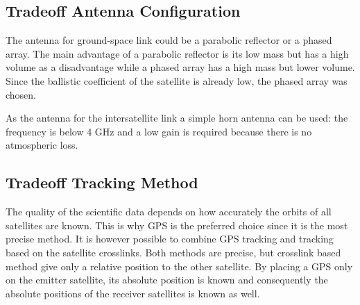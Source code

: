 \subsection{Tradeoff Antenna Configuration}
The antenna for ground-space link could be a parabolic reflector or a phased array. The main advantage of a parabolic reflector is its low mass but has a high volume as a disadvantage while a phased array has a high mass but lower volume. Since the ballistic coefficient of the satellite is already low, the phased array was chosen.

As the antenna for the intersatellite link a simple horn antenna can be used: the frequency is below 4 GHz and a low gain is required because there is no atmospheric loss.

\subsection{Tradeoff Tracking Method}
\label{TOcommTA}
The quality of the scientific data depends on how accurately the orbits of all satellites are known. This is why GPS is the preferred choice since it is the most precise method. It is however possible to combine GPS tracking and tracking based on the satellite crosslinks. Both methods are precise, but crosslink based method give only a relative position to the other satellite. By placing a GPS only on the emitter satellite, its absolute position is known and consequently the absolute positions of the receiver satellites is known as well.
